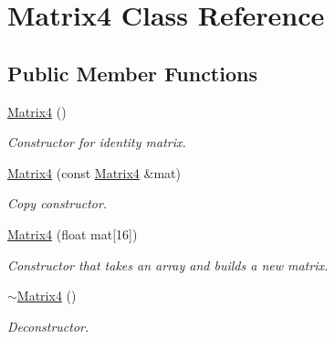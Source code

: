 \hypertarget{class_matrix4}{}\section{Matrix4 Class Reference}
\label{class_matrix4}
\subsection*{Public Member Functions}
\begin{DoxyCompactItemize}
\item 
\mbox{\label{class_matrix4_a21e70a74447b9b05cf9a06400bc9c661}} 
\mbox{\hyperlink{class_matrix4_a21e70a74447b9b05cf9a06400bc9c661}{Matrix4}} ()
\begin{DoxyCompactList}\small\item\em Constructor for identity matrix. \end{DoxyCompactList}\item 
\mbox{\label{class_matrix4_ab6bebf1e26ad75e79d4d57942de9a0c2}} 
\mbox{\hyperlink{class_matrix4_ab6bebf1e26ad75e79d4d57942de9a0c2}{Matrix4}} (const \mbox{\hyperlink{class_matrix4}{Matrix4}} \&mat)
\begin{DoxyCompactList}\small\item\em Copy constructor. \end{DoxyCompactList}\item 
\mbox{\label{class_matrix4_a617298ade1d407310876e78183e47c87}} 
\mbox{\hyperlink{class_matrix4_a617298ade1d407310876e78183e47c87}{Matrix4}} (float mat\mbox{[}16\mbox{]})
\begin{DoxyCompactList}\small\item\em Constructor that takes an array and builds a new matrix. \end{DoxyCompactList}\item 
\mbox{\label{class_matrix4_ae0087573c29359c66423bee7b815ce42}} 
\mbox{\hyperlink{class_matrix4_ae0087573c29359c66423bee7b815ce42}{$\sim$\+Matrix4}} ()
\begin{DoxyCompactList}\small\item\em Deconstructor. \end{DoxyCompactList}\item 
\mbox{\label{class_matrix4_a4733d9680ee4de7f9df3b83ab41b1767}} 

\end{DoxyCompactItemize}
